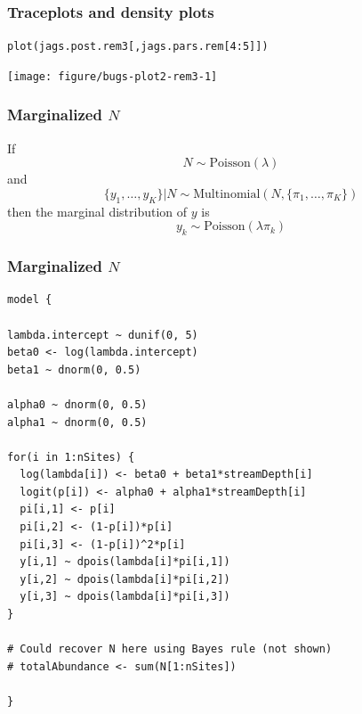 \documentclass[color=usenames,dvipsnames]{beamer}\usepackage[]{graphicx}\usepackage[]{color}
\makeatletter
\newcommand{\hlnum}[1]{\textcolor[rgb]{0.69,0.494,0}{#1}}%
\newcommand{\hlopt}[1]{\textcolor[rgb]{0,0,0}{#1}}%
\newcommand{\hlstd}[1]{\textcolor[rgb]{0,0,0}{#1}}%
\newcommand{\hlkwd}[1]{\textcolor[rgb]{0.004,0.004,0.506}{#1}}%
\newenvironment{kframe}{%
 \def\at@end@of@kframe{}%
 \ifinner\ifhmode%
  \def\at@end@of@kframe{\end{minipage}}%
  \begin{minipage}{\columnwidth}%
 \fi\fi%
 \def\FrameCommand##1{\hskip\@totalleftmargin \hskip-\fboxsep
 \colorbox{shadecolor}{##1}\hskip-\fboxsep
     \hskip-\linewidth \hskip-\@totalleftmargin \hskip\columnwidth}%
 \MakeFramed {\advance\hsize-\width
   \@totalleftmargin\z@ \linewidth\hsize
   \@setminipage}}%
 {\par\unskip\endMakeFramed%
 \at@end@of@kframe}
\newenvironment{knitrout}{}{} %
\makeatother
\begin{document}
\begin{frame}[fragile]
  \frametitle{Traceplots and density plots}
\begin{knitrout}\footnotesize
{}\color{fgcolor}\begin{kframe}
\begin{alltt}
\hlkwd{plot}\hlstd{(jags.post.rem3[,jags.pars.rem[}\hlnum{4}\hlopt{:}\hlnum{5}\hlstd{]])}
\end{alltt}
\end{kframe}

{\centering \texttt{[image: figure/bugs-plot2-rem3-1]} 

}


\end{knitrout}
\end{frame}







\begin{frame}%
  \frametitle{Marginalized $N$}
  If
  \[
    N \sim \mathrm{Poisson}(\lambda)
  \]
  and
  \[
    \{y_1, \dots, y_K\}|N \sim \mathrm{Multinomial}(N, \{\pi_1, \dots, \pi_K\})
  \]
  \pause
  \vfill
  then the marginal distribution of $y$ is
  \[
    y_k \sim \mathrm{Poisson}(\lambda \pi_k) 
  \]
\end{frame}




\begin{frame}[fragile]
  \frametitle{Marginalized $N$}
\begin{knitrout}\scriptsize
{}\color{fgcolor}\begin{kframe}
\begin{verbatim}
model {

lambda.intercept ~ dunif(0, 5)
beta0 <- log(lambda.intercept)
beta1 ~ dnorm(0, 0.5)

alpha0 ~ dnorm(0, 0.5)  
alpha1 ~ dnorm(0, 0.5)

for(i in 1:nSites) {
  log(lambda[i]) <- beta0 + beta1*streamDepth[i]
  logit(p[i]) <- alpha0 + alpha1*streamDepth[i]
  pi[i,1] <- p[i]
  pi[i,2] <- (1-p[i])*p[i]
  pi[i,3] <- (1-p[i])^2*p[i]
  y[i,1] ~ dpois(lambda[i]*pi[i,1])
  y[i,2] ~ dpois(lambda[i]*pi[i,2])
  y[i,3] ~ dpois(lambda[i]*pi[i,3])
}

# Could recover N here using Bayes rule (not shown)
# totalAbundance <- sum(N[1:nSites])

}
\end{verbatim}
\end{kframe}
\end{knitrout}
\end{frame}
\end{document}
